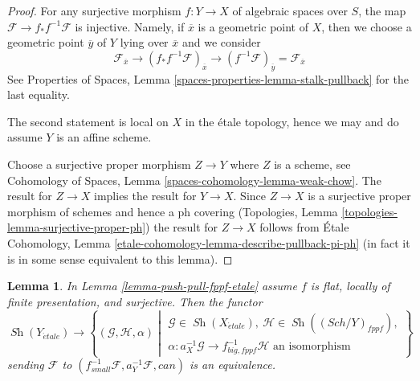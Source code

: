 \documentclass{stacks-project}
\theoremstyle{plain}
\newtheorem{lemma}[subsection]{Lemma}
\theoremstyle{definition}
\theoremstyle{remark}
\numberwithin{equation}{subsection}
\def\Sch{\mathit{Sch}}
\def\Sh{\mathop{\mathit{Sh}}\nolimits}
\def\etale{{\acute{e}tale}}
\begin{document}
\begin{proof}
For any surjective morphism $f : Y \to X$ of algebraic spaces over $S$,
the map $\mathcal{F} \to f_*f^{-1}\mathcal{F}$ is injective.
Namely, if $\overline{x}$ is a geometric point of $X$, then we
choose a geometric point $\overline{y}$ of $Y$ lying over $\overline{x}$
and we consider
$$
\mathcal{F}_{\overline{x}} \to
(f_*f^{-1}\mathcal{F})_{\overline{x}} \to
(f^{-1}\mathcal{F})_{\overline{y}} = \mathcal{F}_{\overline{x}}
$$
See Properties of Spaces, Lemma \ref{spaces-properties-lemma-stalk-pullback}
for the last equality.

\medskip\noindent
The second statement is local on $X$ in the \'etale topology, hence we may
and do assume $Y$ is an affine scheme.

\medskip\noindent
Choose a surjective proper morphism $Z \to Y$ where $Z$ is a scheme, see
Cohomology of Spaces, Lemma \ref{spaces-cohomology-lemma-weak-chow}.
The result for $Z \to X$ implies the result for $Y \to X$.
Since $Z \to X$ is a surjective proper morphism of schemes
and hence a ph covering
(Topologies, Lemma \ref{topologies-lemma-surjective-proper-ph})
the result for $Z \to X$ follows from
\'Etale Cohomology, Lemma \ref{etale-cohomology-lemma-describe-pullback-pi-ph}
(in fact it is in some sense equivalent to this lemma).
\end{proof}

\begin{lemma}
\label{lemma-descent-sheaf-fppf-etale}
In Lemma \ref{lemma-push-pull-fppf-etale} assume
$f$ is flat, locally of finite presentation, and surjective.
Then the functor
$$
\Sh(Y_\etale) \longrightarrow
\left\{
(\mathcal{G}, \mathcal{H}, \alpha)
\middle|
\begin{matrix}
\mathcal{G} \in \Sh(X_\etale),\ \mathcal{H} \in \Sh((\Sch/Y)_{fppf}), \\
\alpha : a_X^{-1}\mathcal{G} \to f_{big, fppf}^{-1}\mathcal{H}
\text{ an isomorphism}
\end{matrix}
\right\}
$$
sending $\mathcal{F}$ to
$(f_{small}^{-1}\mathcal{F}, a_Y^{-1}\mathcal{F}, can)$ is an equivalence.
\end{lemma}
\end{document}

